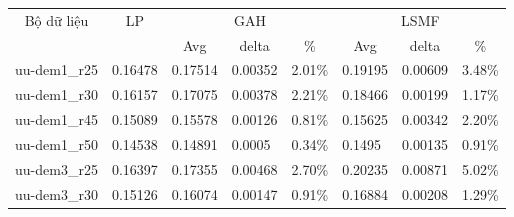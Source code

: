 \begin{table}[H]
    \begin{tabular}{|l|l|l|l|l|l|l|l|}
    \hline
    \multicolumn{1}{|c|}{\multirow{2}{*}{Bộ dữ liệu}} & \multicolumn{1}{c|}{\multirow{2}{*}{LP}} & \multicolumn{3}{c|}{GAH}                                                        & \multicolumn{3}{c|}{LSMF}                                                       \\ \cline{3-8} 
    \multicolumn{1}{|c|}{}                            & \multicolumn{1}{c|}{}                    & \multicolumn{1}{c|}{Avg} & \multicolumn{1}{c|}{delta} & \multicolumn{1}{c|}{\%} & \multicolumn{1}{c|}{Avg} & \multicolumn{1}{c|}{delta} & \multicolumn{1}{c|}{\%} \\ \hline
    uu-dem1\_r25                                & 0.16478                                  & 0.17514                  & 0.00352                    & 2.01\%                  & 0.19195                  & 0.00609                    & 3.48\%                  \\ \hline
    uu-dem1\_r30                                & 0.16157                                  & 0.17075                  & 0.00378                    & 2.21\%                  & 0.18466                  & 0.00199                    & 1.17\%                  \\ \hline
    uu-dem1\_r45                                & 0.15089                                  & 0.15578                  & 0.00126                    & 0.81\%                  & 0.15625                  & 0.00342                    & 2.20\%                  \\ \hline
    uu-dem1\_r50                                & 0.14538                                  & 0.14891                  & 0.0005                     & 0.34\%                  & 0.1495                   & 0.00135                    & 0.91\%                  \\ \hline
    uu-dem3\_r25                                & 0.16397                                  & 0.17355                  & 0.00468                    & 2.70\%                  & 0.20235                  & 0.00871                    & 5.02\%                  \\ \hline
    uu-dem3\_r30                                & 0.15126                                  & 0.16074                  & 0.00147                    & 0.91\%                  & 0.16884                  & 0.00208                    & 1.29\%                  \\ \hline

\end{tabular}
\end{table}
